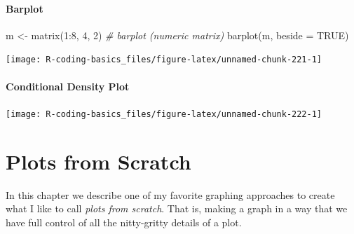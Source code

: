 \documentclass[
]{book}
\newenvironment{Shaded}{\begin{snugshade}}{\end{snugshade}}
\newcommand{\AttributeTok}[1]{\textcolor[rgb]{0.77,0.63,0.00}{#1}}
\newcommand{\CommentTok}[1]{\textcolor[rgb]{0.56,0.35,0.01}{\textit{#1}}}
\newcommand{\ConstantTok}[1]{\textcolor[rgb]{0.00,0.00,0.00}{#1}}
\newcommand{\DecValTok}[1]{\textcolor[rgb]{0.00,0.00,0.81}{#1}}
\newcommand{\FunctionTok}[1]{\textcolor[rgb]{0.00,0.00,0.00}{#1}}
\newcommand{\NormalTok}[1]{#1}
\newcommand{\OtherTok}[1]{\textcolor[rgb]{0.56,0.35,0.01}{#1}}
\newcommand{\SpecialCharTok}[1]{\textcolor[rgb]{0.00,0.00,0.00}{#1}}
\begin{document}
\hypertarget{barplot}{%
\subsubsection*{Barplot}\label{barplot}}

\begin{Shaded}
\begin{Highlighting}[]
\NormalTok{m }\OtherTok{\textless{}{-}} \FunctionTok{matrix}\NormalTok{(}\DecValTok{1}\SpecialCharTok{:}\DecValTok{8}\NormalTok{, }\DecValTok{4}\NormalTok{, }\DecValTok{2}\NormalTok{)}
\CommentTok{\# barplot (numeric matrix)}
\FunctionTok{barplot}\NormalTok{(m, }\AttributeTok{beside =} \ConstantTok{TRUE}\NormalTok{)}
\end{Highlighting}
\end{Shaded}

\begin{center}\texttt{[image: R-coding-basics\_files/figure-latex/unnamed-chunk-221-1]} \end{center}

\hypertarget{conditional-density-plot}{%
\subsubsection*{Conditional Density Plot}\label{conditional-density-plot}}

\begin{Shaded}
\end{Shaded}

\begin{center}\texttt{[image: R-coding-basics\_files/figure-latex/unnamed-chunk-222-1]} \end{center}

\hypertarget{graphics3}{%
\chapter{Plots from Scratch}\label{graphics3}}

In this chapter we describe one of my favorite graphing approaches to create
what I like to call \emph{plots from scratch}. That is, making a graph in a way
that we have full control of all the nitty-gritty details of a plot.
\end{document}
